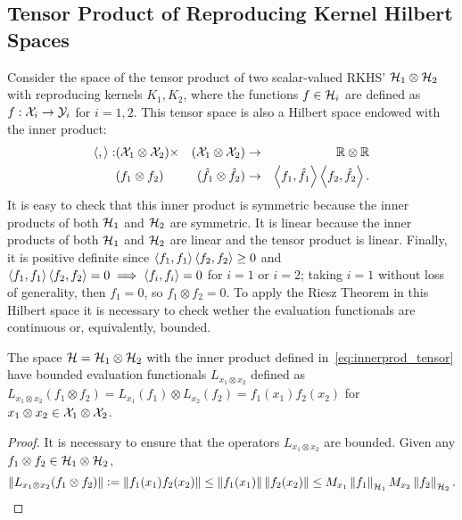 \subsection{Tensor Product of Reproducing Kernel Hilbert Spaces}
Consider the space of the tensor product of two scalar-valued RKHS' $\mathcal{H}_1 \otimes \mathcal{H}_2$ with reproducing kernels $K_1, K_2$, where the functions $f \in \mathcal{H}_i$ are defined as $f: \mathcal{X}_i \to \mathcal{Y}_i$ for $i=1, 2$. This tensor space is also a Hilbert space endowed with the inner product:
\begin{equation}
    \label{eq:innerprod_tensor}
    \begin{aligned}
        \dotp{}{}: &(\Xspace_1 \otimes \Xspace_2) \times &(\Xspace_1 \otimes \Xspace_2) &\to & \reals \otimes \reals \\
    &(f_1 \otimes f_2) &(\hat{f}_1 \otimes \hat{f}_2) &\to &\dotp{f_1}{\hat{f}_1} \dotp{f_2}{\hat{f}_2}.
    \end{aligned}
\end{equation}
It is easy to check that this inner product is symmetric because the inner products of both $\mathcal{H}_1$ and $\mathcal{H}_2$ are symmetric. It is linear because the inner products of both $\mathcal{H}_1$ and $\mathcal{H}_2$ are linear and the tensor product is linear. Finally, it is positive definite since 
$  \left\langle f_1, f_1 \right\rangle  \left\langle f_2, f_2 \right\rangle \geq 0$ and
$\left\langle f_1, f_1 \right\rangle  \left\langle f_2, f_2 \right\rangle = 0 \implies \left\langle f_i, f_i \right\rangle = 0$ for $i=1$ or $i=2$; taking $i=1$ without loss of generality, then $f_1 = 0$, so $f_1 \otimes f_2 = 0$. To apply the Riesz Theorem in this Hilbert space it is necessary to check wether the evaluation functionals are continuous or, equivalently, bounded.
%
\begin{proposition}
    The space $\mathcal{H} = \mathcal{H}_1 \otimes \mathcal{H}_2$ with the inner product defined in~\eqref{eq:innerprod_tensor} have bounded evaluation functionals $L_{x_1 \otimes x_2} $ defined as $L_{x_1 \otimes x_2} (f_1 \otimes f_2) =L_{x_1}(f_1) \otimes L_{x_2}(f_2) = f_1(x_1) f_2(x_2)$ for $x_1 \otimes x_2 \in \mathcal{X}_1 \otimes \mathcal{X}_2$.
\end{proposition}
\begin{proof}
    It is necessary to ensure that the operators $L_{x_1 \otimes x_2}$ are bounded. Given any $f_1 \otimes f_2 \in \mathcal{H}_1 \otimes \mathcal{H}_2$, 
    $$ \left\lVert L_{x_1 \otimes x_2} (f_1 \otimes f_2)\right\rVert \vcentcolon= \left\lVert f_1(x_1) f_2(x_2)\right\rVert \leq \left\lVert f_1(x_1)\right\rVert  \left\lVert f_2(x_2)\right\rVert \leq M_{x_1} \left\lVert f_1\right\rVert_{\mathcal{H}_1} M_{x_2} \left\lVert f_2\right\rVert_{\mathcal{H}_2} .$$
\end{proof}
